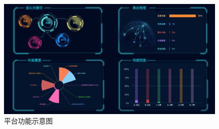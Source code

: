 \begin{figure}[ht]
    \centering
    \includegraphics[width=\linewidth]{figures/demo.png}
    \caption{平台功能示意图}
    \label{fig:demo}
\end{figure}
